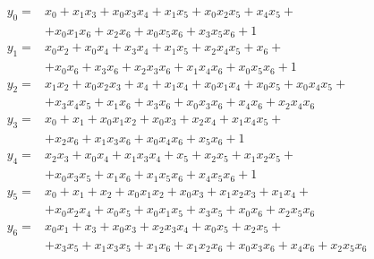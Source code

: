 \begin{equation}
    \label{eqn:misty-s7}
    \begin{array}{ll}
        y_0 =& x_0 + x_1 x_3 + x_0 x_3 x_4 + x_1 x_5 + x_0 x_2 x_5 + x_4 x_5 + \\
             & + x_0 x_1 x_6 + x_2 x_6 + x_0 x_5 x_6 + x_3 x_5 x_6 + 1 \\
        y_1 =& x_0 x_2 + x_0 x_4 +x_3 x_4 +x_1 x_5 + x_2 x_4 x_5 +x_6 + \\
             & + x_0 x_6 +x_3 x_6 +x_2 x_3 x_6 + x_1 x_4 x_6 + x_0 x_5 x_6 +1 \\
        y_2 =& x_1 x_2 + x_0 x_2 x_3 + x_4 + x_1 x_4 + x_0 x_1 x_4 + x_0 x_5 + x_0 x_4 x_5 + \\
             & + x_3 x_4 x_5 + x_1 x_6 + x_3 x_6 + x_0 x_3 x_6 + x_4 x_6 + x_2 x_4 x_6 \\
        y_3 =& x_0 + x_1 + x_0 x_1 x_2 + x_0 x_3 + x_2 x_4 + x_1 x_4 x_5 + \\
             & + x_2 x_6 + x_1 x_3 x_6 + x_0 x_4 x_6 + x_5 x_6 + 1 \\ 
        y_4 =& x_2 x_3 + x_0 x_4 + x_1 x_3 x_4 + x_5 + x_2 x_5 + x_1 x_2 x_5 + \\
             & + x_0 x_3 x_5 + x_1 x_6 + x_1 x_5 x_6 + x_4 x_5 x_6 + 1 \\
        y_5 =& x_0 + x_1 + x_2 + x_0 x_1 x_2 + x_0 x_3 + x_1 x_2 x_3 + x_1 x_4 + \\
             & + x_0 x_2 x_4 + x_0 x_5 + x_0 x_1 x_5 + x_3 x_5 + x_0 x_6 + x_2 x_5 x_6 \\
        y_6 =& x_0 x_1 + x_3 + x_0 x_3 + x_2 x_3 x_4 + x_0 x_5 + x_2 x_5 + \\
             & + x_3 x_5 + x_1 x_3 x_5 + x_1 x_6 + x_1 x_2 x_6 + x_0 x_3 x_6 + x_4 x_6 + x_2 x_5 x_6 \\
    \end{array}
\end{equation}

